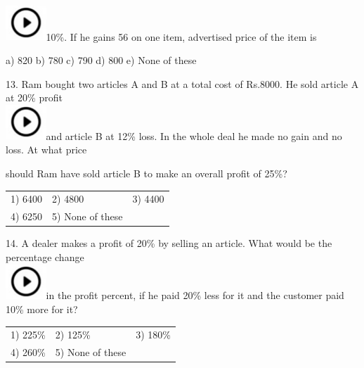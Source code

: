 \documentclass{article}
\begin{document}
	\noindent \noindent \\ \includegraphics*[width=0.60in, height=0.52in]{images/image1}10\%. If he gains 56 on one item, advertised price of the item is
	
	\noindent a) 820                      b) 780               c) 790                d) 800               e) None of these
	
	\noindent 
	
	\noindent 
	
	\noindent 
	
	\noindent 
	
	13. Ram bought two articles A and B at a total cost of Rs.8000. He sold article A at 20\% profit \noindent \\ \includegraphics*[width=0.60in, height=0.52in]{images/image1}and article B at 12\% loss. In the whole deal he made no gain and no loss. At what price
	
	\noindent should Ram have sold article B to make an overall profit of 25\%?
	
	\noindent 
	
	\noindent  
	\begin{tabular}{p{1.7in} p{1.6in} p{1.6in}} \\ 
 1) 6400                    & 2) 4800             & 3) 4400             \\
4) 6250             & 5) None of these  \\
\end{tabular}
	
	\noindent 
	
	14. A dealer makes a profit of 20\% by selling an article. What would be the percentage change \noindent \\ \includegraphics*[width=0.60in, height=0.52in]{images/image1}in the profit percent, if he paid 20\% less for it and the customer paid 10\% more for it?
	
	\noindent  
	\begin{tabular}{p{1.7in} p{1.6in} p{1.6in}} \\ 
 1) 225\%                  & 2) 125\%            & 3) 180\%            \\
4) 260\%            & 5) None of these  \\
\end{tabular}
	
\end{document}
